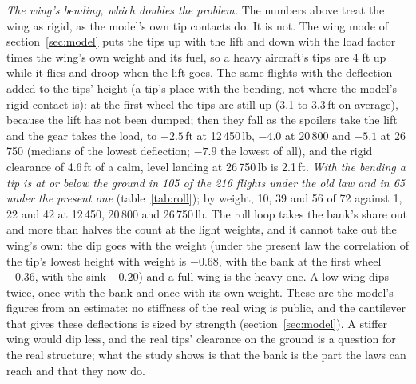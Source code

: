 \documentclass[10pt,a4paper,twocolumn]{article}
\begin{document}
\emph{The wing's bending, which doubles the problem.} The numbers above treat the wing as rigid, as the model's own tip contacts do. It is not. The wing mode of section~\ref{sec:model} puts the tips up with the lift and down with the load factor times the wing's own weight and its
fuel, so a heavy aircraft's tips are 4 ft up while it flies and droop when the lift goes. The same flights with the deflection added to the tips' height (a tip's place with the bending, not where the model's rigid contact is): at the first wheel the tips are still up (3.1 to 3.3\,ft on average), because the lift has not been dumped;
then they fall as the spoilers take the lift and the gear takes the load, to $-2.5$\,ft at 12\,450\,lb, $-4.0$ at 20\,800 and $-5.1$ at 26\,750 (medians of the lowest deflection; $-7.9$ the lowest of all), and the rigid clearance of 4.6\,ft of a calm, level landing at 26\,750\,lb is 2.1\,ft. \emph{With the bending a tip is at or below the ground
in 105 of the 216 flights under the old law and in 65 under the present one} (table~\ref{tab:roll}); by weight, 10, 39 and 56 of 72 against 1, 22 and 42 at 12\,450, 20\,800 and 26\,750\,lb. The roll loop takes the bank's share out and more than halves the count at the light weights, and it cannot take out the wing's own: the dip goes with the weight (under the present law the correlation of the tip's lowest height with weight is $-0.68$, with the
bank at the first wheel $-0.36$, with the sink $-0.20$) and a full wing is the heavy one. A low wing dips twice, once with the bank and once with its own weight. These are the model's figures from an estimate: no stiffness of the real wing is public, and the cantilever that gives these deflections is sized by strength (section~\ref{sec:model}). A stiffer wing would
dip less, and the real tips' clearance on the ground is a question for the real structure; what the study shows is that the bank is the part the laws can reach and that they now do.
\end{document}
